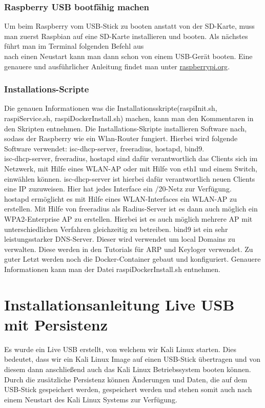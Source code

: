 \subsubsection{Raspberry USB bootfähig machen}
\label{subsec:USBBoot}
Um beim Raspberry vom USB-Stick zu booten anstatt von der SD-Karte, muss man zuerst Raspbian auf eine SD-Karte installieren und booten. Als nächstes führt man im Terminal folgenden Befehl aus\\  nach einen Neustart kann man dann schon von einem USB-Gerät booten. Eine genauere und ausführlicher Anleitung findet man unter \href{https://www.raspberrypi.org/documentation/hardware/raspberrypi/bootmodes/msd.md
}{raspberrypi.org}.

\subsubsection{Installations-Scripte}
Die genauen Informationen was die Installationsskripte(raspiInit.sh, raspiService.sh, raspiDockerInstall.sh) machen, kann man den Kommentaren in den Skripten entnehmen. Die Installations-Skripte installieren Software nach, sodass der Raspberry wie ein Wlan-Router fungiert. Hierbei wird folgende Software verwendet: isc-dhcp-server, freeradius, hostapd, bind9.\\
isc-dhcp-server, freeradius, hostapd sind dafür verantwortlich das Clients sich im Netzwerk, mit Hilfe eines WLAN-AP oder mit Hilfe von eth1 und einem Switch, einwählen können. 
isc-dhcp-server ist hierbei dafür verantwortlich neuen Clients eine IP zuzuweisen. Hier hat jedes Interface ein /20-Netz zur Verfügung.\\%
hostapd ermöglicht es mit Hilfe eines WLAN-Interfaces ein WLAN-AP zu erstellen. Mit Hilfe von freeradius als Radius-Server ist es dann auch möglich ein WPA2-Enterprise AP zu erstellen. Hierbei ist es auch möglich mehrere AP mit unterschiedlichen Verfahren gleichzeitig zu betreiben.
bind9 ist ein sehr leistungsstarker DNS-Server. Dieser wird verwendet um local Domains zu verwalten. Diese werden in den Tutorials für ARP und Keyloger verwendet.
Zu guter Letzt werden noch die Docker-Container gebaut und konfiguriert. Genauere Informationen kann man der Datei raspiDockerInstall.sh entnehmen.

\section{Installationsanleitung Live USB mit Persistenz}
\label{sec:InstallLiveUSB}
Es wurde ein Live USB erstellt, von welchem wir Kali Linux starten. Dies bedeutet, dass wir ein Kali Linux Image auf einen USB-Stick übertragen und von diesem dann anschließend auch das Kali Linux Betriebssystem booten können. 
Durch die zusätzliche Persistenz können Änderungen und Daten, die auf dem USB-Stick gespeichert werden, gespeichert werden und stehen somit auch nach einem Neustart des Kali Linux Systems zur Verfügung.

